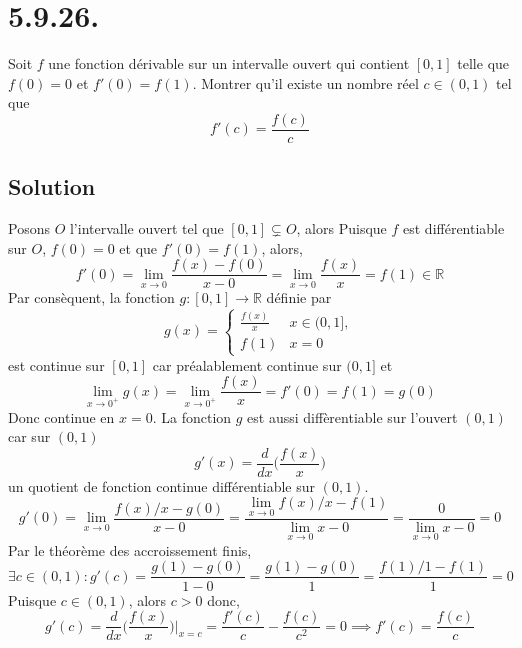 \section*{5.9.26.}
	Soit $f$ une fonction dérivable sur un intervalle ouvert qui contient $[0,1]$ telle que $f(0)=0$ et $f'(0)=f(1)$. Montrer qu'il existe un nombre réel $c\in (0,1)$ tel que
		\[f'(c)=\frac{f(c)}{c}\]
	\subsection*{Solution}
		Posons $O$ l'intervalle ouvert tel que  $[0,1]\subsetneq O$, alors
		Puisque $f$ est différentiable sur $O$,  $f(0)=0$ et que $f'(0)=f(1)$, alors, 
		\[f'(0)=\lim_{x\to 0} \frac{f(x)-f(0)}{x-0}=\lim_{x\to 0}\frac{f(x)}{x}=f(1)\in \mathbb{R}\]
		Par consèquent, la fonction $g:[0,1]\longrightarrow\mathbb{R}$ définie par \[g(x)=\begin{cases}
		\frac{f(x)}{x} & x\in (0,1],\\
		f(1)& x=0
		\end{cases}\]
		est continue sur $[0,1]$ car préalablement continue sur $(0,1]$ et \[\lim_{x\to 0^+}g(x)=\lim_{x\to 0^+}\frac{f(x)}{x}=f'(0)=f(1)=g(0)\]
		Donc continue en $x=0$. La fonction $g$ est aussi diffèrentiable sur l'ouvert $(0,1)$ car sur $(0,1)$
		\[g'(x)=\frac{d}{dx}\Big(\frac{f(x)}{x}\Big)\]
		un quotient de fonction continue différentiable sur $(0,1)$.
 \[g'(0)=\lim_{x\to 0} \frac{f(x)/x - g(0)}{x-0}=\frac{\lim_{x\to 0} f(x)/x - f(1)}{\lim_{x\to 0} x - 0}=\frac{0}{\lim_{x\to 0} x -0}=0\]
		Par le théorème des accroissement finis, 
		\[\exists c\in (0,1) : g'(c)=\frac{g(1)-g(0)}{1-0}=\frac{g(1)-g(0)}{1}=\frac{f(1)/1-f(1)}{1}=0\]
		Puisque $c\in (0,1)$, alors $c>0$ donc,
		\[g'(c)=\frac{d}{dx}\Big(\frac{f(x)}{x}\Big)\Big\lvert_{x=c}=\frac{f'(c)}{c} - \frac{f(c)}{c^2}=0\implies f'(c)=\frac{f(c)}{c}\]
		
		
	